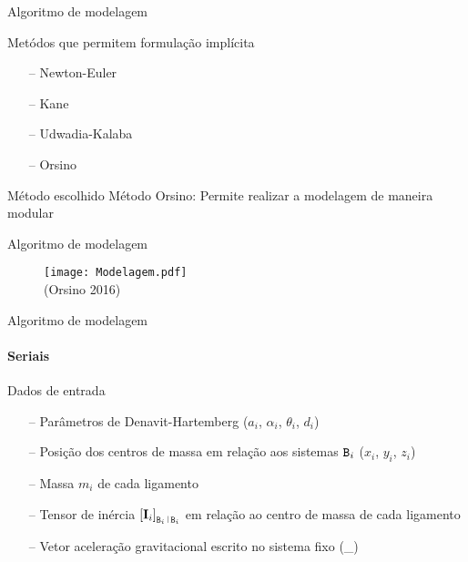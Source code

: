 \documentclass[25pt,landscape]{beamer}
\begin{document}
\begin{frame}{Algoritmo de modelagem}
    \begin{block}{Met\'odos que permitem formula\c{c}\~ao impl\'icita}
        \pause
        \begin{itemize}
            \item[--] Newton-Euler \\[4pt]
            \item[--] Kane \\[4pt]
            \item[--] Udwadia-Kalaba \\[4pt]
            \item[--] Orsino \\[4pt]
        \end{itemize}
    \end{block}
    \pause
    \begin{block}{M\'etodo escolhido}
        \pause
        M\'etodo Orsino: \pause Permite realizar a modelagem de maneira modular
    \end{block}
\end{frame}

\begin{frame}{Algoritmo de modelagem}
    \begin{figure}[!h]
        \centering
        \texttt{[image: Modelagem.pdf]} \\
        (Orsino 2016)
    \end{figure}  
\end{frame}

\begin{frame}{Algoritmo de modelagem}
    \framesubtitle{Seriais}
    \pause
    \begin{block}{Dados de entrada}
    	\begin{itemize}
    		\item[--] Par\^ametros de Denavit-Hartemberg ($a_i$, $\alpha_i$, $\theta_i$, $d_i$) \\[8pt]
    		\item[--] Posi\c{c}\~ao dos centros de massa em rela\c{c}\~ao aos sistemas $\mathtt{B}_i$ ($x_i$, $y_i$, $z_i$) \\[8pt]
    		\item[--] Massa $m_i$ de cada ligamento \\[8pt]
    		\item[--] Tensor de in\'ercia $\vct{\vI_i}_{\ttB_i \rl \ttB_i}$ em rela\c{c}\~ao ao centro de massa de cada ligamento \\[8pt]
    		\item[--] Vetor acelera\c{c}\~ao gravitacional escrito no sistema fixo (\vct{\vg}_{\ttN}) \\[8pt]
    	\end{itemize}
    \end{block}
\end{frame}
\end{document}
